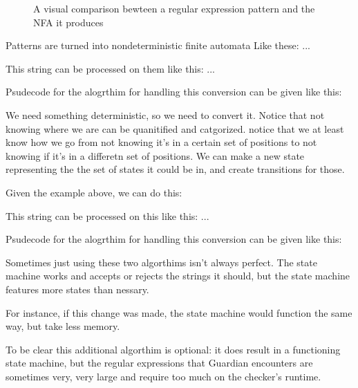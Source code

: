 {{\begin{figure}
\begin{center}
			\end{center}
			
			\caption{A visual comparison bewteen a regular expression pattern
				and the NFA it produces}
		\end{figure}
		
		
		
		Patterns are turned into nondeterministic finite automata
		Like these:
			...
		
		This string can be processed on them like this:
			...
		
		
		Psudecode for the alogrthim for handling this conversion can be given
		like this:
		{
		}
		
		We need something deterministic, so we need to convert it.
		Notice that not knowing where we are can be quanitified and catgorized.
		notice that we at least know how we go from not knowing it's in a certain
		set of positions to not knowing if it's in a differetn set of positions.
		We can make a new state representing the the set of states it could
		be in, and create transitions for those.
		
		Given the example above, we can do this:
		
		This string can be processed on this like this:
			...
		
		Psudecode for the alogrthim for handling this conversion can be given
		like this:
		{
		}
		
		Sometimes just using these two algorthims isn't always perfect.
		The state machine works and accepts or rejects the strings it should,
		but the state machine features more states than nessary.
		
		For instance, if this change was made, the state machine would function
		the same way, but take less memory.
		
		To be clear this additional algorthim is optional: it does result in
		a functioning state machine, but the regular expressions that
		Guardian encounters are sometimes very, very large and require too much
		on the checker's runtime.
		
}}
